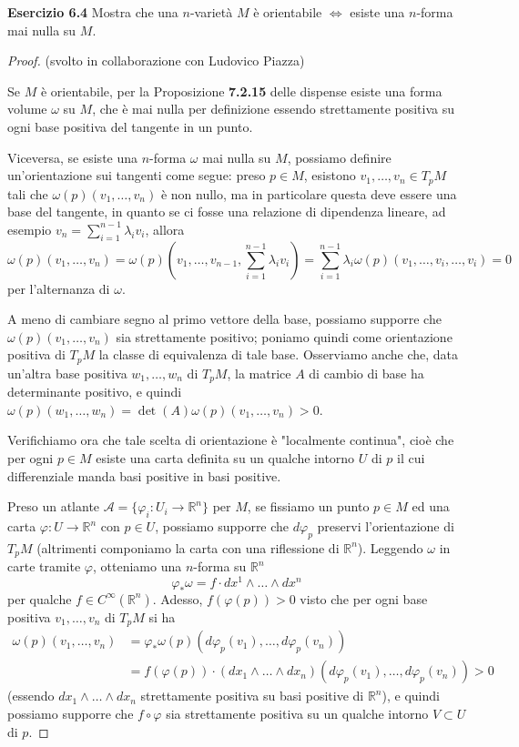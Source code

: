 \documentclass[a4paper]{article}
\newcommand{\R}{\mathbb{R}}
\theoremstyle{definition}
\theoremstyle{definition}
\theoremstyle{remark}
\theoremstyle{definition}
\begin{document}
\textbf{Esercizio 6.4}
Mostra che una $n$-varietà $M$ è orientabile $\iff$ esiste una $n$-forma mai nulla su $M$.

\begin{proof} (svolto in collaborazione con Ludovico Piazza)

    Se $M$ è orientabile, per la Proposizione \textbf{7.2.15} delle dispense esiste una forma volume $\omega$ su $M$, che è mai nulla per definizione essendo strettamente positiva su ogni
    base positiva del tangente in un punto.

    Viceversa, se esiste una $n$-forma $\omega$ mai nulla su $M$, possiamo definire un'orientazione sui tangenti come segue: preso $p\in M$, esistono $v_1,\ldots,v_n\in T_pM$ tali
    che $\omega(p)(v_1,\ldots,v_n)$ è non nullo, ma in particolare questa deve essere una base del tangente, in quanto se ci fosse una relazione di dipendenza lineare, ad esempio $v_n = \sum_{i=1}^{n-1}\lambda_i v_i$, allora
    \[
        \omega(p)(v_1,\ldots,v_n) = \omega(p)(v_1,\ldots,v_{n-1},\sum_{i=1}^{n-1}\lambda_i v_i) = \sum_{i=1}^{n-1}\lambda_i\omega(p)(v_1,\ldots,v_i,\ldots,v_i) = 0
    \]
    per l'alternanza di $\omega$.

    A meno di cambiare segno al primo vettore della base, possiamo supporre che $\omega(p)(v_1,\ldots,v_n)$ sia strettamente positivo; poniamo quindi come orientazione positiva di
    $T_pM$ la classe di equivalenza di tale base.
    Osserviamo anche che, data un'altra base positiva $w_1,\ldots,w_n$ di $T_pM$, la matrice $A$ di cambio di base ha
    determinante positivo, e quindi $\omega(p)(w_1,\ldots,w_n) = \det(A)\omega(p)(v_1,\ldots,v_n) > 0$.

    Verifichiamo ora che tale scelta di orientazione è "localmente continua", cioè che per ogni $p\in M$ esiste una carta definita su un qualche intorno $U$ di $p$ il cui
    differenziale manda basi positive in basi positive.

    Preso un atlante $\mathcal{A}=\{\varphi_i:U_i\to \R^n\}$ per $M$, se fissiamo un punto $p\in M$ ed una
    carta $\varphi:
    U\to \R^n$ con $p\in U$, possiamo supporre che $d\varphi_p$ preservi l'orientazione di $T_pM$ (altrimenti componiamo la carta con una riflessione di $\R^n$). Leggendo $\omega$ in
    carte tramite $\varphi$, otteniamo una $n$-forma su $\R^n$
    \[
        \varphi_*\omega = f\cdot dx^1\wedge\ldots\wedge dx^n
    \]
    per qualche $f\in C^\infty(\R^n)$. Adesso, $f (\varphi (p)) > 0$ visto che per ogni base positiva $v_1,\ldots,v_n$ di $T_pM$ si ha
    \begin{align*}
        \omega (p)(v_1,\ldots,v_n) &= \varphi_*\omega(p)(d\varphi_p(v_1),\ldots,d\varphi_p(v_n))\\
        &= f(\varphi(p))\cdot (dx_1\wedge\ldots\wedge dx_n)(d\varphi_p(v_1),\ldots,d\varphi_p(v_n)) > 0
    \end{align*}
(essendo $dx_1\wedge\ldots\wedge dx_n$ strettamente positiva su basi positive di $\R^n$), e quindi possiamo supporre che $f\circ\varphi$ sia strettamente positiva su un qualche intorno $V\subset U$ di $p$.


\end{proof}
\end{document}
